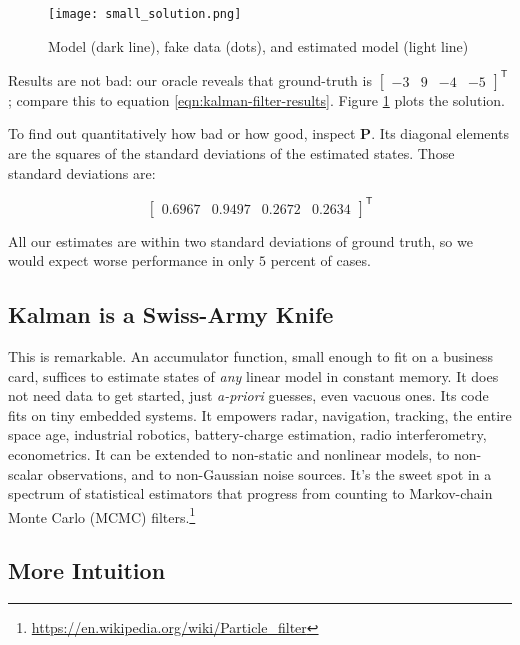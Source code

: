 \documentclass[10pt,oneside,x11names]{article}
\begin{document}
\begin{enumerate}
\begin{figure}[htb]
\centering
\texttt{[image: small\_solution.png]}
\caption{\label{fig:orgparagraph2}
Model (dark line), fake data (dots), and estimated model (light line)}
\end{figure}

Results are not bad: our oracle reveals that ground-truth is
\(\begin{bmatrix}-3& 9& -4& -5\end{bmatrix}^{\mathsf{T}}\); compare
this to equation \ref{eqn:kalman-filter-results}.
Figure \ref{fig:orgparagraph2} plots the solution.

To find out quantitatively how bad or how good,  inspect
\(\mathbold{P}\). Its diagonal elements are the squares of the
standard deviations of the estimated states. Those standard deviations are:

\begin{equation}
\begin{bmatrix}
0.6967 & 0.9497 & 0.2672 & 0.2634
\end{bmatrix}
^{\mathsf{T}}
\end{equation}

All our estimates are within two standard deviations of
ground truth, so we would expect worse performance in only \(5\) percent of
cases.
\end{enumerate}

\subsection{Kalman is a Swiss-Army Knife}
\label{sec:orgheadline18}

This is remarkable. An accumulator function, small enough to fit on a business
card, suffices to estimate states of \emph{any} linear model in constant memory. It
does not need data to get started, just \emph{a-priori} guesses, even vacuous ones.
Its code fits on tiny embedded systems. It empowers radar, navigation,
tracking, the entire space age, industrial robotics, battery-charge estimation,
radio interferometry, econometrics. It can be extended to non-static and
nonlinear models, to non-scalar observations, and to non-Gaussian noise sources.
It's the sweet spot in a spectrum of statistical estimators that progress from
counting to Markov-chain Monte Carlo (MCMC) filters.\footnote{\url{https://en.wikipedia.org/wiki/Particle_filter}}

\subsection{More Intuition}
\label{sec:orgheadline19}
\end{document}
